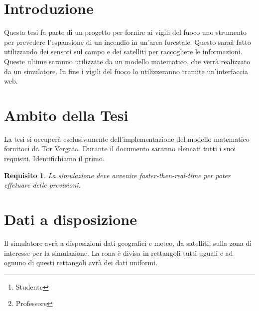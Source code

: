 \documentclass[draft]{article}
\title{\mytitle}
\date{2021}
\author{Diego Bellani\thanks{Studente}\and Enrico Tronci\thanks{Professore}}
\newcommand{\eng}[1]{\foreignlanguage{english}{#1}} %
\newtheorem{requirement}{Requisito}
\begin{document}
\begin{titlepage}
	\maketitle

	\begin{abstract}
	Questo documento  contiene le specifiche dei
	requisiti per la tesi sulla simulazione \eng{multi-core} di incendi.
	\end{abstract}

	\tableofcontents
	\listoffigures
	\listoftables
\end{titlepage}

\section{Introduzione}

Questa tesi fa parte di un progetto per fornire ai vigili del fuoco uno
strumento per prevedere l'espansione di un incendio in un'area forestale. Questo
saraà fatto utilizzando dei sensori sul campo e dei satelliti per raccogliere le
informazioni. Queste ultime saranno utilizzate da un modello matematico, che
verrà realizzato da un simulatore. In fine i vigili del fuoco lo utilizzeranno
tramite un'interfaccia web.

\section{Ambito della Tesi}

La tesi si occuperà esclusivamente dell'implementazione del modello matematico
fornitoci da Tor Vergata. Durante il documento saranno elencati tutti i suoi
requisiti. Identifichiamo il primo.

\begin{requirement}
La simulazione deve avvenire \eng{faster-then-real-time} per poter effetuare
delle previsioni.
\end{requirement}

\section{Dati a disposizione}

Il simulatore avrà a disposizioni dati geografici e meteo, da satelliti, sulla
zona di interesse per la simulazione. La rona è divisa in rettangoli tutti
uguali e ad ognuno di questi rettangoli avrà dei dati uniformi.
\end{document}
